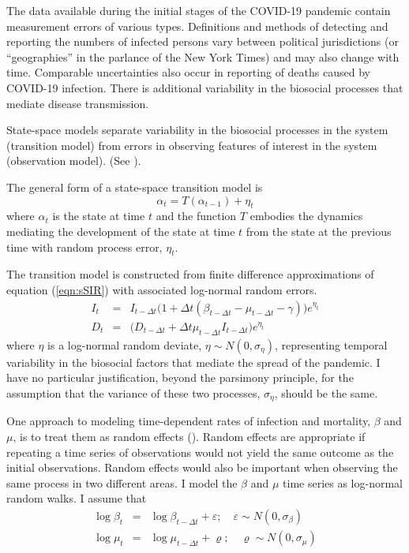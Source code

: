 \documentclass[12pt,letterpaper]{article}
\begin{document}
The data available during the initial stages of the COVID-19 pandemic
contain measurement errors of various types.
Definitions and methods of detecting and reporting the numbers of
infected persons vary between political jurisdictions (or
``geographies'' in the parlance of the New York Times) and may also
change with time.
Comparable uncertainties also occur in reporting of deaths caused
by COVID-19 infection.
There is additional variability in the biosocial
processes that mediate disease transmission.

State-space models separate variability in the biosocial
processes in the system (transition model)
from errors in observing features of interest
in the system (observation model).
(See \cite{Harvey1990}).

The general form of a state-space transition model is
\begin{equation}
\alpha_t=T(\alpha_{t-1}) + \eta_t
\end{equation}
where $\alpha_t$ is the state at time $t$ and 
the function $T$ embodies the dynamics mediating the
development of the state at time $t$ from the state at the previous
time with random process error, $\eta_t$.

The transition model is constructed from finite difference
approximations of equation (\ref{eqn:sSIR}) with associated log-normal
random errors.
\begin{eqnarray}
\label{eqn:sSIRfd}
I_t &=& I_{t-\Delta t}\big(1+\Delta t(\beta_{t-\Delta t} - \mu_{t-\Delta t}
- \gamma)\big)e^{\eta_t}\\
D_t &=& \big(D_{t-\Delta t} + \Delta t \mu_{t-\Delta t}I_{t-\Delta
t}\big)e^{\eta_t}
\end{eqnarray}
where $\eta$ is a log-normal random deviate, $\eta\sim
N(0,\sigma_\eta)$, representing temporal variability in the biosocial
factors that mediate the spread of the pandemic. I have no particular
justification, beyond the parsimony principle, for the assumption that
the variance of these two processes, $\sigma_\eta$, should be the
same.

One approach to modeling time-dependent rates of infection and
mortality, $\beta$ and $\mu$, is to treat them as random effects
(\cite{Skaug2006}). Random effects are appropriate if repeating a time
series of observations would not yield the same outcome as the initial
observations. Random effects would also be important when observing
the same process in two different areas. I model the  $\beta$ and
$\mu$ time series as log-normal random walks. I assume that
\begin{eqnarray}
\log\beta_t &=& \log\beta_{t-\Delta t}+\varepsilon;\quad \varepsilon\sim 
N(0,\sigma_\beta)\\
\log\mu_t &=& \log\mu_{t-\Delta t}+\varrho;\quad \varrho\sim
N(0,\sigma_\mu)
\end{eqnarray}
\end{document}
